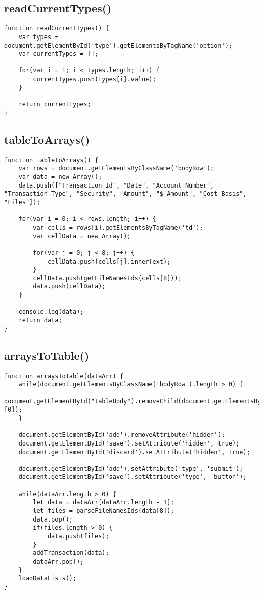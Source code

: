\documentclass[letterpaper]{article}
\begin{document}
\subsection{readCurrentTypes()}

\begin{lstlisting}[firstnumber=734]
function readCurrentTypes() {
    var types = document.getElementById('type').getElementsByTagName('option');
    var currentTypes = [];

    for(var i = 1; i < types.length; i++) {
        currentTypes.push(types[i].value);
    }

    return currentTypes;
}
\end{lstlisting}

\subsection{tableToArrays()}

\begin{lstlisting}[firstnumber=745]
function tableToArrays() {
    var rows = document.getElementsByClassName('bodyRow');
    var data = new Array();
    data.push(["Transaction Id", "Date", "Account Number", "Transaction Type", "Security", "Amount", "$ Amount", "Cost Basis", "Files"]);

    for(var i = 0; i < rows.length; i++) {
        var cells = rows[i].getElementsByTagName('td');
        var cellData = new Array();

        for(var j = 0; j < 8; j++) {
            cellData.push(cells[j].innerText);
        }
        cellData.push(getFileNamesIds(cells[8]));
        data.push(cellData);
    }

    console.log(data);
    return data;
}
\end{lstlisting}

\subsection{arraysToTable()}

\begin{lstlisting}[firstnumber=765]
function arraysToTable(dataArr) {
    while(document.getElementsByClassName('bodyRow').length > 0) {
        document.getElementById("tableBody").removeChild(document.getElementsByClassName('bodyRow')[0]);
    }

    document.getElementById('add').removeAttribute('hidden');
    document.getElementById('save').setAttribute('hidden', true);
    document.getElementById('discard').setAttribute('hidden', true);

    document.getElementById('add').setAttribute('type', 'submit');
    document.getElementById('save').setAttribute('type', 'button');

    while(dataArr.length > 0) {
        let data = dataArr[dataArr.length - 1];
        let files = parseFileNamesIds(data[8]);
        data.pop();
        if(files.length > 0) {
            data.push(files);
        }
        addTransaction(data);
        dataArr.pop();
    }
    loadDataLists();
}
\end{lstlisting}
\end{document}

